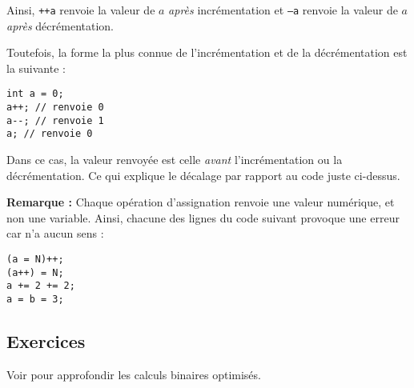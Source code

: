\documentclass[../../../main.tex]{subfiles}
\begin{document}
Ainsi, \texttt{++a} renvoie la valeur de $a$ \textit{après} incrémentation et \texttt{--a}  renvoie la valeur de $a$ \textit{après} décrémentation.
 
Toutefois, la forme la plus connue de l'incrémentation et de la décrémentation est la suivante :
\begin{verbatim}
int a = 0;
a++; // renvoie 0
a--; // renvoie 1
a; // renvoie 0
\end{verbatim}
Dans ce cas, la valeur renvoyée est celle \textit{avant} l'incrémentation ou la décrémentation. Ce qui explique le décalage par rapport au code juste ci-dessus.
 
\textbf{Remarque :} Chaque opération d'assignation renvoie une valeur numérique, et non une variable. Ainsi, chacune des lignes du code suivant provoque une erreur car n'a aucun sens :
\begin{verbatim}
(a = N)++;
(a++) = N;
a += 2 += 2;
a = b = 3;
\end{verbatim}
\subsection{Exercices}
Voir \cite{BitHacks} pour approfondir les calculs binaires optimisés.
\end{document}

